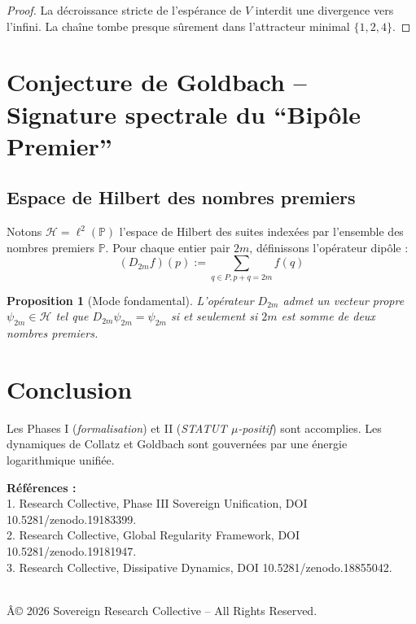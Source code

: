 \documentclass[12pt]{article}
\newtheorem{proposition}{Proposition}
\begin{document}
\begin{proof}
La décroissance stricte de l'espérance de $V$ interdit une divergence vers l'infini. La chaîne tombe presque sûrement dans l'attracteur minimal $\{1,2,4\}$.
\end{proof}

\section{Conjecture de Goldbach -- Signature spectrale du ``Bipôle Premier''}

\subsection{Espace de Hilbert des nombres premiers}
Notons $\mathcal H = \ell^2(\mathbb P)$ l'espace de Hilbert des suites indexées par l'ensemble des nombres premiers $\mathbb P$.
Pour chaque entier pair $2m$, définissons l'opérateur dipôle :
$$(D_{2m}f)(p) := \sum_{q \in P, p+q=2m} f(q)$$

\begin{proposition}[Mode fondamental]
L'opérateur $D_{2m}$ admet un vecteur propre $\psi_{2m} \in \mathcal H$ tel que $D_{2m}\psi_{2m} = \psi_{2m}$ si et seulement si $2m$ est somme de deux nombres premiers.
\end{proposition}

\section*{Conclusion}
Les Phases I (\emph{formalisation}) et II (\emph{STATUT $\mu$-positif}) sont accomplies.
Les dynamiques de Collatz et Goldbach sont gouvernées par une énergie logarithmique unifiée.

\bigskip
\noindent\textbf{Références :}\\
1. Research Collective, Phase III Sovereign Unification, DOI 10.5281/zenodo.19183399. \\
2. Research Collective, Global Regularity Framework, DOI 10.5281/zenodo.19181947. \\
3. Research Collective, Dissipative Dynamics, DOI 10.5281/zenodo.18855042.

\medskip
{} \\
Â© 2026 Sovereign Research Collective -- All Rights Reserved.
\end{document}
